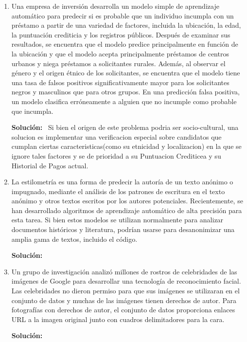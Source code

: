\documentclass[11pt,letterpaper]{article}
\newenvironment{solution}{%
  \noindent\begin{shaded}
  \textbf{Solución:}\ }{
  \end{shaded}%
}
\begin{document}
\begin{enumerate}
\item%
  Una empresa de inversión desarrolla un modelo simple de aprendizaje
  automático para predecir si es probable que un individuo incumpla
  con un préstamo a partir de una variedad de factores, incluida la
  ubicación, la edad, la puntuación crediticia y los registros
  públicos.  Después de examinar sus resultados, se encuentra que el
  modelo predice principalmente en función de la ubicación y que el
  modelo acepta principalmente préstamos de centros urbanos y niega
  préstamos a solicitantes rurales.  Además, al observar el género y
  el origen étnico de los solicitantes, se encuentra que el modelo
  tiene una tasa de falsos positivos significativamente mayor para los
  solicitantes negros y masculinos que para otros grupos.  En una
  predicción falsa positiva, un modelo clasifica erróneamente a
  alguien que no incumple como probable que incumpla.
  \begin{solution}
    Si bien el origen de este problema podria ser socio-cultural, una solucion es implementar una verificacion especial sobre candidatos que cumplan ciertas caracteristicas(como su etnicidad y localizacion) en la que se ignore tales factores y se de prioridad a su Puntuacion Crediticea y su Historial de Pagos actual.
  \end{solution}
\newpage
\item%
  La estilometría es una forma de predecir la autoría de un texto
  anónimo o impugnado, mediante el análisis de los patrones de
  escritura en el texto anónimo y otros textos escritos por los
  autores potenciales.  Recientemente, se han desarrollado algoritmos
  de aprendizaje automático de alta precisión para esta tarea.  Si
  bien estos modelos se utilizan normalmente para analizar documentos
  históricos y literatura, podrían usarse para desanonimizar una
  amplia gama de textos, incluido el código.
  \begin{solution}
  \end{solution}

\item%
  Un grupo de investigación analizó millones de rostros de
  celebridades de las imágenes de Google para desarrollar una
  tecnología de reconocimiento facial.  Las celebridades no dieron
  permiso para que sus imágenes se utilizaran en el conjunto de datos
  y muchas de las imágenes tienen derechos de autor.  Para fotografías
  con derechos de autor, el conjunto de datos proporciona enlaces URL
  a la imagen original junto con cuadros delimitadores para la cara.
  \begin{solution}
  \end{solution}
  

\end{enumerate}
\end{document}
